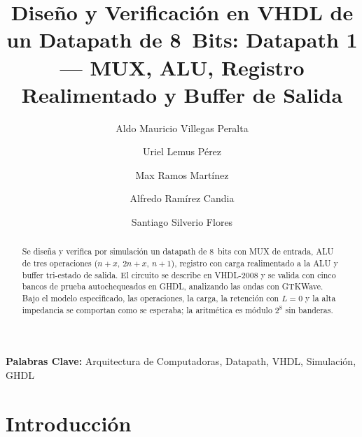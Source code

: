 \documentclass[llncs]{llncs}
\begin{document}
\title{Diseño y Verificación en {VHDL} de un Datapath de 8~Bits:
Datapath 1 --- MUX, ALU, Registro Realimentado y Buffer de Salida}

\author{Aldo Mauricio Villegas Peralta\and
Uriel Lemus Pérez\and
Max Ramos Martínez\and
Alfredo Ramírez Candia\and
Santiago Silverio Flores}


\maketitle

\begin{abstract}
Se diseña y verifica por simulación un datapath de 8~bits con MUX
de entrada, ALU de tres operaciones ($n+x$, $2n+x$, $n+1$), registro con
carga realimentado a la ALU y buffer tri-estado de salida. El circuito se
describe en VHDL-2008 y se valida con cinco bancos de prueba autochequeados
en GHDL, analizando las ondas con GTKWave. Bajo el modelo especificado, las
operaciones, la carga, la retención con $L=0$ y la alta impedancia se
comportan como se esperaba; la aritmética es módulo $2^8$ sin banderas.
\end{abstract}

\noindent\textbf{Palabras Clave:} Arquitectura de Computadoras, Datapath,
VHDL, Simulación, GHDL

\section{Introducción}
\label{sec:intro}
\end{document}
